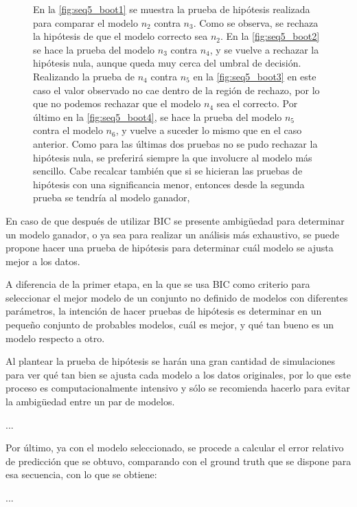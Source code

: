 \begin{figure}[t!]
{\begin{subfigure}[b]{0.7\textwidth}
      \caption{}
      \label{fig:seq5_boot4}
    \end{subfigure}
  }
  \caption[Secuencia 5: Pruebas de hipótesis usando bootstrap]{En la \autoref{fig:seq5_boot1} se muestra la prueba de hipótesis realizada para comparar el modelo $n_2$ contra $n_3$. Como se observa, se rechaza la hipótesis de que el modelo correcto sea $n_2$. En la \autoref{fig:seq5_boot2} se hace la prueba del modelo $n_3$ contra $n_4$, y se vuelve a rechazar la hipótesis nula, aunque queda muy cerca del umbral de decisión. Realizando la prueba de $n_4$ contra $n_5$ en la \autoref{fig:seq5_boot3} en este caso el valor observado no cae dentro de la región de rechazo, por lo que no podemos rechazar que el modelo $n_4$ sea el correcto. Por último en la \autoref{fig:seq5_boot4}, se hace la prueba del modelo $n_5$ contra el modelo $n_6$, y vuelve a suceder lo mismo que en el caso anterior. Como para las últimas dos pruebas no se pudo rechazar la hipótesis nula, se preferirá siempre la que involucre al modelo más sencillo. Cabe recalcar también que si se hicieran las pruebas de hipótesis con una significancia menor, entonces desde la segunda prueba se tendría al modelo ganador,}
  \label{fig:seq5_boot}
\end{figure}

En caso de que después de utilizar BIC se presente ambigüedad para determinar un modelo ganador, o ya sea para realizar un análisis más exhaustivo, se puede propone hacer una prueba de hipótesis para determinar cuál modelo se ajusta mejor a los datos.

A diferencia de la primer etapa, en la que se usa BIC como criterio para  seleccionar el mejor modelo de un conjunto no definido de modelos con diferentes parámetros, la intención de hacer pruebas de hipótesis es determinar en un pequeño conjunto de probables modelos, cuál es mejor, y qué tan bueno es un modelo respecto a otro.

Al plantear la prueba de hipótesis se harán una gran cantidad de simulaciones para ver qué tan bien se ajusta cada modelo a los datos originales, por lo que este proceso es computacionalmente intensivo y sólo se recomienda hacerlo para evitar la ambigüedad entre un par de modelos.

...

Por último, ya con el modelo seleccionado, se procede a calcular el error relativo de predicción que se obtuvo, comparando con el ground truth que se dispone para esa secuencia, con lo que se obtiene: 

...

